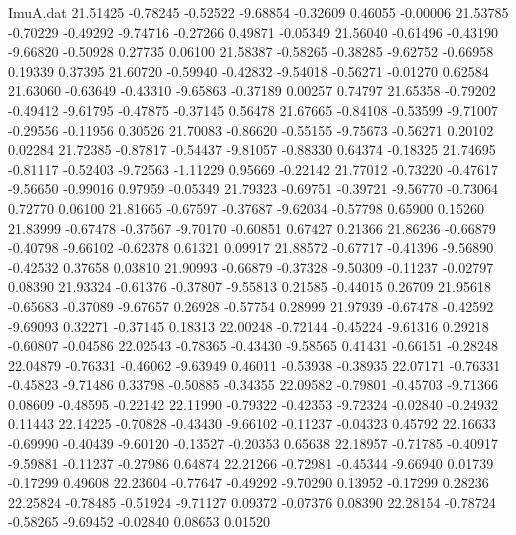 \begin{filecontents}{ImuA.dat}
  21.51425   -0.78245   -0.52522   -9.68854   -0.32609    0.46055   -0.00006
  21.53785   -0.70229   -0.49292   -9.74716   -0.27266    0.49871   -0.05349
  21.56040   -0.61496   -0.43190   -9.66820   -0.50928    0.27735    0.06100
  21.58387   -0.58265   -0.38285   -9.62752   -0.66958    0.19339    0.37395
  21.60720   -0.59940   -0.42832   -9.54018   -0.56271   -0.01270    0.62584
  21.63060   -0.63649   -0.43310   -9.65863   -0.37189    0.00257    0.74797
  21.65358   -0.79202   -0.49412   -9.61795   -0.47875   -0.37145    0.56478
  21.67665   -0.84108   -0.53599   -9.71007   -0.29556   -0.11956    0.30526
  21.70083   -0.86620   -0.55155   -9.75673   -0.56271    0.20102    0.02284
  21.72385   -0.87817   -0.54437   -9.81057   -0.88330    0.64374   -0.18325
  21.74695   -0.81117   -0.52403   -9.72563   -1.11229    0.95669   -0.22142
  21.77012   -0.73220   -0.47617   -9.56650   -0.99016    0.97959   -0.05349
  21.79323   -0.69751   -0.39721   -9.56770   -0.73064    0.72770    0.06100
  21.81665   -0.67597   -0.37687   -9.62034   -0.57798    0.65900    0.15260
  21.83999   -0.67478   -0.37567   -9.70170   -0.60851    0.67427    0.21366
  21.86236   -0.66879   -0.40798   -9.66102   -0.62378    0.61321    0.09917
  21.88572   -0.67717   -0.41396   -9.56890   -0.42532    0.37658    0.03810
  21.90993   -0.66879   -0.37328   -9.50309   -0.11237   -0.02797    0.08390
  21.93324   -0.61376   -0.37807   -9.55813    0.21585   -0.44015    0.26709
  21.95618   -0.65683   -0.37089   -9.67657    0.26928   -0.57754    0.28999
  21.97939   -0.67478   -0.42592   -9.69093    0.32271   -0.37145    0.18313
  22.00248   -0.72144   -0.45224   -9.61316    0.29218   -0.60807   -0.04586
  22.02543   -0.78365   -0.43430   -9.58565    0.41431   -0.66151   -0.28248
  22.04879   -0.76331   -0.46062   -9.63949    0.46011   -0.53938   -0.38935
  22.07171   -0.76331   -0.45823   -9.71486    0.33798   -0.50885   -0.34355
  22.09582   -0.79801   -0.45703   -9.71366    0.08609   -0.48595   -0.22142
  22.11990   -0.79322   -0.42353   -9.72324   -0.02840   -0.24932    0.11443
  22.14225   -0.70828   -0.43430   -9.66102   -0.11237   -0.04323    0.45792
  22.16633   -0.69990   -0.40439   -9.60120   -0.13527   -0.20353    0.65638
  22.18957   -0.71785   -0.40917   -9.59881   -0.11237   -0.27986    0.64874
  22.21266   -0.72981   -0.45344   -9.66940    0.01739   -0.17299    0.49608
  22.23604   -0.77647   -0.49292   -9.70290    0.13952   -0.17299    0.28236
  22.25824   -0.78485   -0.51924   -9.71127    0.09372   -0.07376    0.08390
  22.28154   -0.78724   -0.58265   -9.69452   -0.02840    0.08653    0.01520

\end{filecontents}
